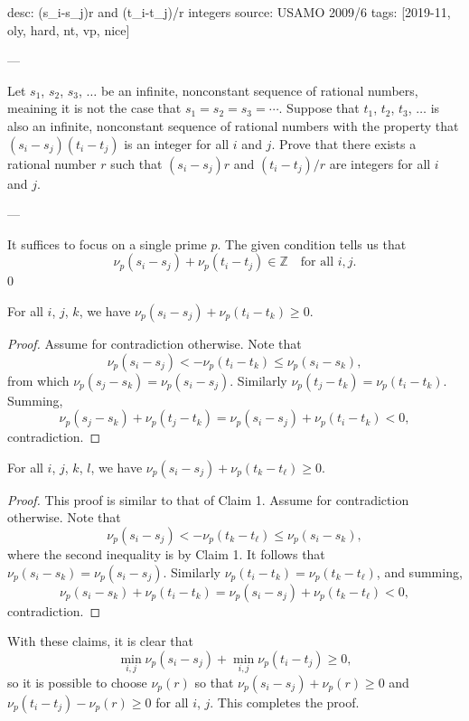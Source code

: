 desc: (s_i-s_j)r and (t_i-t_j)/r integers
source: USAMO 2009/6
tags: [2019-11, oly, hard, nt, vp, nice]

---

Let $s_1$, $s_2$, $s_3$, $\ldots$ be an infinite, nonconstant sequence of rational numbers, meaining it is not the case that $s_1=s_2=s_3=\cdots$. Suppose that $t_1$, $t_2$, $t_3$, $\ldots$ is also an infinite, nonconstant sequence of rational numbers with the property that $(s_i-s_j)(t_i-t_j)$ is an integer for all $i$ and $j$. Prove that there exists a rational number $r$ such that $(s_i-s_j)r$ and $(t_i-t_j)/r$ are integers for all $i$ and $j$.

---

It suffices to focus on a single prime $p$. The given condition tells us that \[\nu_p(s_i-s_j)+\nu_p(t_i-t_j)\in\mathbb Z\quad\text{for all }i,j.\]
\setcounter{claim}0
\begin{claim}
    For all $i$, $j$, $k$, we have $\nu_p(s_i-s_j)+\nu_p(t_i-t_k)\ge0$.
\end{claim}
\begin{proof}
    Assume for contradiction otherwise. Note that \[\nu_p(s_i-s_j)<-\nu_p(t_i-t_k)\le\nu_p(s_i-s_k),\]
    from which $\nu_p(s_j-s_k)=\nu_p(s_i-s_j)$. Similarly $\nu_p(t_j-t_k)=\nu_p(t_i-t_k)$. Summing, \[\nu_p(s_j-s_k)+\nu_p(t_j-t_k)=\nu_p(s_i-s_j)+\nu_p(t_i-t_k)<0,\]
    contradiction.
\end{proof}
\begin{claim}
    For all $i$, $j$, $k$, $l$, we have $\nu_p(s_i-s_j)+\nu_p(t_k-t_\ell)\ge0$.
\end{claim}
\begin{proof}
    This proof is similar to that of Claim 1. Assume for contradiction otherwise. Note that \[\nu_p(s_i-s_j)<-\nu_p(t_k-t_\ell)\le\nu_p(s_i-s_k),\]
    where the second inequality is by Claim 1. It follows that $\nu_p(s_i-s_k)=\nu_p(s_i-s_j)$. Similarly $\nu_p(t_i-t_k)=\nu_p(t_k-t_\ell)$, and summing, \[\nu_p(s_i-s_k)+\nu_p(t_i-t_k)=\nu_p(s_i-s_j)+\nu_p(t_k-t_\ell)<0,\]
    contradiction.
\end{proof}

With these claims, it is clear that \[\min_{i,j}\nu_p(s_i-s_j)+\min_{i,j}\nu_p(t_i-t_j)\ge0,\]
so it is possible to choose $\nu_p(r)$ so that $\nu_p(s_i-s_j)+\nu_p(r)\ge0$ and $\nu_p(t_i-t_j)-\nu_p(r)\ge0$ for all $i$, $j$. This completes the proof.

